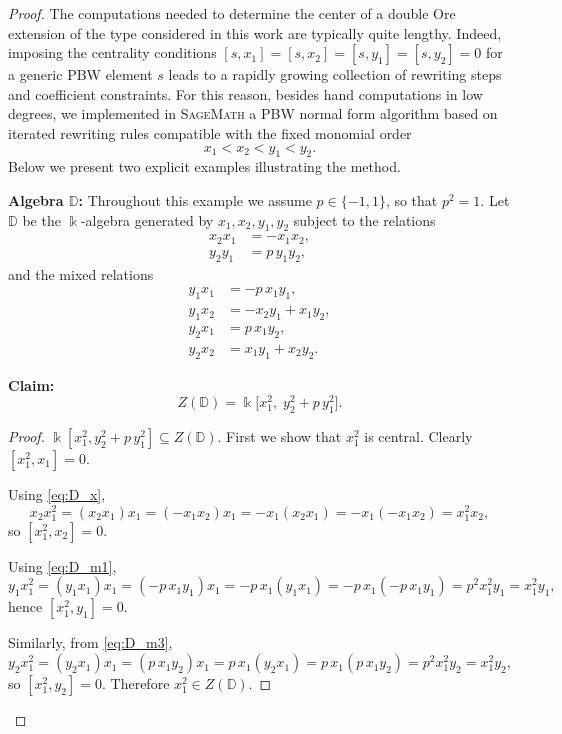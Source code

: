\documentclass{amsart}
\theoremstyle{definition}
\theoremstyle{remark}
\numberwithin{equation}{section}
\begin{document}
\begin{proof}

The computations needed to determine the center of a double Ore extension of the type considered in this work
are typically quite lengthy. Indeed, imposing the centrality conditions
\(
[s,x_1]=[s,x_2]=[s,y_1]=[s,y_2]=0
\)
for a generic PBW element \(s\) leads to a rapidly growing collection of rewriting steps and coefficient constraints.
For this reason, besides hand computations in low degrees, we implemented in \textsc{SageMath} a PBW normal form
algorithm based on iterated rewriting rules compatible with the fixed monomial order
\[
x_1 < x_2 < y_1 < y_2.
\]
Below we present two explicit examples illustrating the method.


{\bf Algebra $\mathbb{D}$:} Throughout this example we assume \(p\in\{-1,1\}\), so that \(p^2=1\).
Let $\mathbb{D}$ be the \(\Bbbk\)-algebra generated by \(x_1,x_2,y_1,y_2\) subject to the relations
\begin{align}
x_2x_1&=-x_1x_2, \label{eq:D_x}\\
y_2y_1&=p\,y_1y_2, \label{eq:D_y}
\end{align}
and the mixed relations
\begin{align}
y_1x_1&=-p\,x_1y_1, \label{eq:D_m1}\\
y_1x_2&=-x_2y_1+x_1y_2, \label{eq:D_m2}\\
y_2x_1&=p\,x_1y_2, \label{eq:D_m3}\\
y_2x_2&=x_1y_1+x_2y_2. \label{eq:D_m4}
\end{align}

{\bf Claim:}
\[
Z(\mathbb{D})=\Bbbk\big[x_1^2,\;y_2^2+p\,y_1^2\big].
\]

\begin{proof}
\(\Bbbk[x_1^2,y_2^2+p\,y_1^2]\subseteq Z(\mathbb{D})\).
First we show that \(x_1^2\) is central. Clearly \([x_1^2,x_1]=0\).

Using \eqref{eq:D_x},
\[
x_2x_1^2=(x_2x_1)x_1=(-x_1x_2)x_1=-x_1(x_2x_1)=-x_1(-x_1x_2)=x_1^2x_2,
\]
so \([x_1^2,x_2]=0\).

Using \eqref{eq:D_m1},
\[
y_1x_1^2=(y_1x_1)x_1=(-p\,x_1y_1)x_1=-p\,x_1(y_1x_1)
=-p\,x_1(-p\,x_1y_1)=p^2x_1^2y_1=x_1^2y_1,
\]
hence \([x_1^2,y_1]=0\).

Similarly, from \eqref{eq:D_m3},
\[
y_2x_1^2=(y_2x_1)x_1=(p\,x_1y_2)x_1=p\,x_1(y_2x_1)
=p\,x_1(p\,x_1y_2)=p^2x_1^2y_2=x_1^2y_2,
\]
so \([x_1^2,y_2]=0\). Therefore \(x_1^2\in Z(\mathbb{D})\).


\end{proof}
\end{proof}
\end{document}
